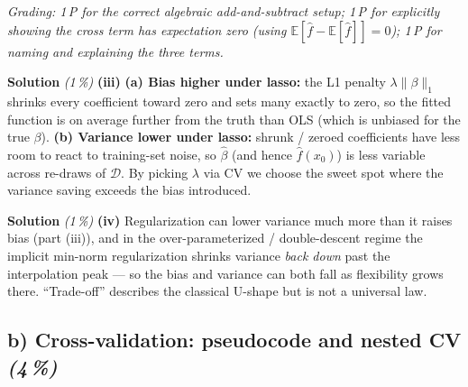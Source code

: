 \documentclass[11pt,a4paper]{article}
\newcommand{\subpoints}[1]{\textit{(#1\,\%)}}
\newcommand{\sol}{\noindent\textbf{Solution}}
\begin{document}
\noindent\emph{Grading: 1\,P for the correct algebraic add-and-subtract setup; 1\,P for explicitly
showing the cross term has expectation zero (using $\mathbb{E}[\hat f - \mathbb{E}[\hat f]] = 0$);
1\,P for naming and explaining the three terms.}

\medskip
\sol{} \subpoints{1} \textbf{(iii)}
\textbf{(a) Bias higher under lasso:} the L1 penalty $\lambda\|\beta\|_1$ shrinks every coefficient
toward zero and sets many exactly to zero, so the fitted function is on average further from the
truth than OLS (which is unbiased for the true $\beta$).
\textbf{(b) Variance lower under lasso:} shrunk / zeroed coefficients have less room to react to
training-set noise, so $\hat\beta$ (and hence $\hat f(x_0)$) is less variable across re-draws of
$\mathcal D$. By picking $\lambda$ via CV we choose the sweet spot where the variance saving
exceeds the bias introduced.

\medskip
\sol{} \subpoints{1} \textbf{(iv)} Regularization can lower variance much more than it raises bias
(part (iii)), and in the over-parameterized / double-descent regime the implicit min-norm
regularization shrinks variance \emph{back down} past the interpolation peak --- so the bias and
variance can both fall as flexibility grows there. ``Trade-off'' describes the classical U-shape
but is not a universal law.

\subsection*{b) Cross-validation: pseudocode and nested CV \subpoints{4}}
\end{document}

